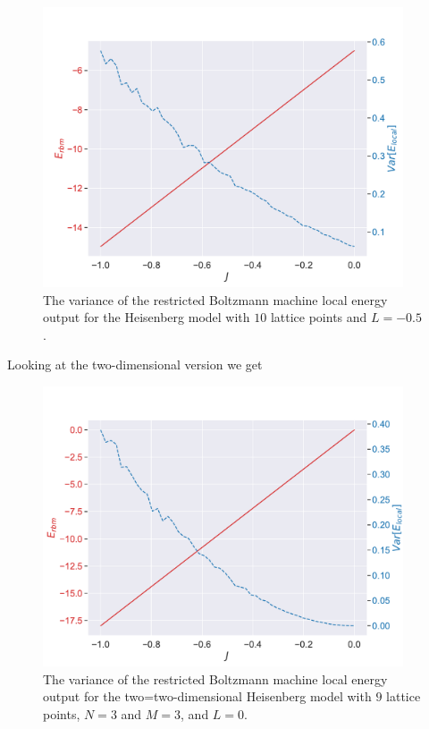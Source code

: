 \begin{figure}[H]
  \begin{center}
    \includegraphics[width=0.95\textwidth]{Figures/Plots/Heisen/[J][-1.0-0.0][e=500][n=10][N=10][M=1][L=-0.5]}
  \end{center}
  \caption{The variance of the restricted Boltzmann machine local energy output for the Heisenberg model with $10$ lattice points and $L=-0.5$.}
\end{figure}

Looking at the two-dimensional version we get

\begin{figure}[H]
  \begin{center}
    \includegraphics[width=0.95\textwidth]{Figures/Plots/Heisen/[J][-1.0-0.0][e=500][n=9][N=3][M=3][L=0]}
  \end{center}
  \caption{The variance of the restricted Boltzmann machine local energy output for the two=two-dimensional Heisenberg model with $9$ lattice points, $N=3$ and $M=3$, and $L=0$.}
\end{figure}


